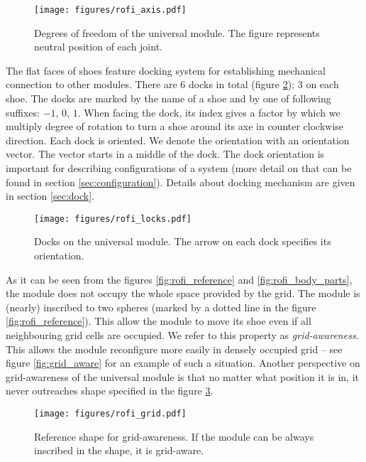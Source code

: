 \begin{figure}
    \centering
    \texttt{[image: figures/rofi\_axis.pdf]}
    \caption{Degrees of freedom of the universal module. The figure represents neutral position of each joint.}
    \label{fig:rofi_axis}
\end{figure}

The flat faces of shoes feature docking system for establishing mechanical
connection to other modules. There are 6 docks in total (figure
\ref{fig:rofi_locks}); 3 on each shoe. The docks are marked by the name of a
shoe and by one of following suffixes: $-1$, $0$, $1$. When facing the dock, its
index gives a factor by which we multiply degree of rotation to turn a shoe
around its axe in counter clockwise direction. Each dock is oriented. We denote
the orientation with an orientation vector. The vector starts in a middle of the
dock. The dock orientation is important for describing configurations of a
system (more detail on that can be found in section \ref{sec:configuration}).
Details about docking mechanism are given in section \ref{sec:dock}.

\begin{figure}
    \centering
    \texttt{[image: figures/rofi\_locks.pdf]}
    \caption{Docks on the universal module. The arrow on each dock specifies its orientation.}
    \label{fig:rofi_locks}
\end{figure}

As it can be seen from the figures \ref{fig:rofi_reference} and
\ref{fig:rofi_body_parts}, the module does not occupy the whole space provided
by the grid. The module is (nearly) inscribed to two spheres (marked by a dotted
line in the figure \ref{fig:rofi_reference}). This allow the module to move its
shoe even if all neighbouring grid cells are occupied. We refer to this property
as \emph{grid-awareness}. This allows the module reconfigure more easily in
densely occupied grid -- see figure \ref{fig:grid_aware} for an example of such
a situation. Another perspective on grid-awareness of the universal module is
that no matter what position it is in, it never outreaches shape specified in
the figure \ref{fig:rofi_grid}.

\begin{figure}
    \centering
    \texttt{[image: figures/rofi\_grid.pdf]}
    \caption{Reference shape for grid-awareness. If the module can be always inscribed in the shape, it is grid-aware.}
    \label{fig:rofi_grid}
\end{figure}

